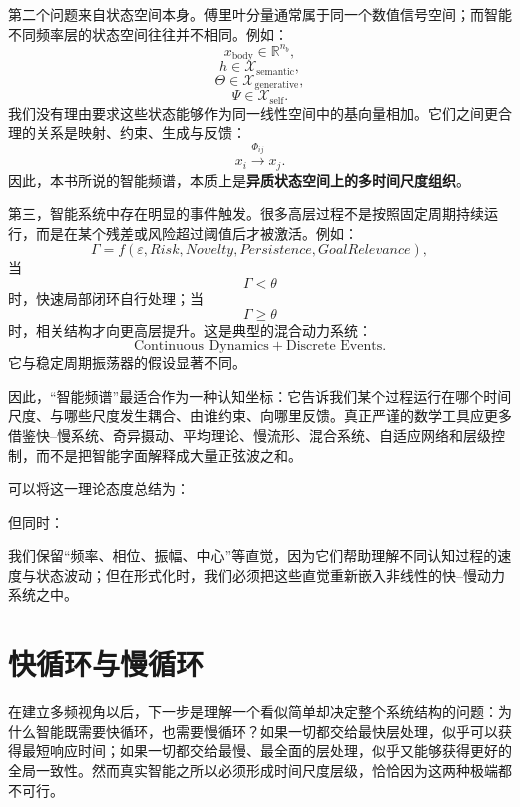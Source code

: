 第二个问题来自状态空间本身。傅里叶分量通常属于同一个数值信号空间；而智能不同频率层的状态空间往往并不相同。例如：
\[
x_{\mathrm{body}}
\in
\mathbb{R}^{n_b},
\]
\[
h
\in
\mathcal{X}_{\mathrm{semantic}},
\]
\[
\Theta
\in
\mathcal{X}_{\mathrm{generative}},
\]
\[
\Psi
\in
\mathcal{X}_{\mathrm{self}}.
\]
我们没有理由要求这些状态能够作为同一线性空间中的基向量相加。它们之间更合理的关系是映射、约束、生成与反馈：
\[
x_i
\xrightarrow{\Phi_{ij}}
x_j.
\]
因此，本书所说的智能频谱，本质上是\textbf{异质状态空间上的多时间尺度组织}。

第三，智能系统中存在明显的事件触发。很多高层过程不是按照固定周期持续运行，而是在某个残差或风险超过阈值后才被激活。例如：
\[
\Gamma
=
f
\left(
\varepsilon,
Risk,
Novelty,
Persistence,
GoalRelevance
\right),
\]
当
\[
\Gamma<\theta
\]
时，快速局部闭环自行处理；当
\[
\Gamma\geq\theta
\]
时，相关结构才向更高层提升。这是典型的混合动力系统：
\[
\text{Continuous Dynamics}
+
\text{Discrete Events}.
\]
它与稳定周期振荡器的假设显著不同。

因此，“智能频谱”最适合作为一种认知坐标：它告诉我们某个过程运行在哪个时间尺度、与哪些尺度发生耦合、由谁约束、向哪里反馈。真正严谨的数学工具应更多借鉴快--慢系统、奇异摄动、平均理论、慢流形、混合系统、自适应网络和层级控制，而不是把智能字面解释成大量正弦波之和。

可以将这一理论态度总结为：
\begin{statementbox}
\centering
{}
\end{statementbox}
但同时：
\begin{statementbox}
\centering
{}
\end{statementbox}
我们保留“频率、相位、振幅、中心”等直觉，因为它们帮助理解不同认知过程的速度与状态波动；但在形式化时，我们必须把这些直觉重新嵌入非线性的快--慢动力系统之中。

\section{快循环与慢循环}

在建立多频视角以后，下一步是理解一个看似简单却决定整个系统结构的问题：为什么智能既需要快循环，也需要慢循环？如果一切都交给最快层处理，似乎可以获得最短响应时间；如果一切都交给最慢、最全面的层处理，似乎又能够获得更好的全局一致性。然而真实智能之所以必须形成时间尺度层级，恰恰因为这两种极端都不可行。

